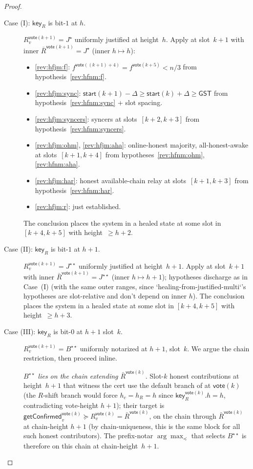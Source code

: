 \documentclass{article}
\newcommand{\key}{\mathsf{key}}
\newcommand{\start}{\mathsf{start}}
\newcommand{\vote}{\mathsf{vote}}
\newcommand{\comm}[1]{\bar{#1}}
\newcommand{\getConfirmed}{\textsf{getConfirmed}\xspace}
\theoremstyle{plain}
\theoremstyle{definition}
\theoremstyle{remark}
\newcommand{\GST}{\ensuremath{\mathsf{GST}}}
\newcommand{\OHM}{online-honest majority\xspace}
\newcommand{\HAR}{honest available-chain relay\xspace}
\newcommand{\AHA}{all-honest-awake\xspace}
\begin{document}
\begin{proof}
\begin{description}
\item[{Case (I): $\key_R$ is bit-$1$ at $h$.}]\hfill

$R_v^{\vote(k+1)} = J^\star$ uniformly justified at height~$h$. Apply  at slot~$k+1$ with inner $\comm{R}^{\vote(k+1)} = J^\star$ (inner $h \mapsto h$):
\begin{itemize}
  \item \ref{rev:hfjm:f}: $f^{\vote((k+1)+4)} = f^{\vote(k+5)} < n/3$ from hypothesis~\ref{rev:hfnm:f}.
  \item \ref{rev:hfjm:sync}: $\start(k+1) - \Delta \geq \start(k) + \Delta \geq \GST$ from hypothesis~\ref{rev:hfnm:sync} + slot spacing.
  \item \ref{rev:hfjm:syncers}: syncers at slots~$[k+2, k+3]$ from hypothesis~\ref{rev:hfnm:syncers}.
  \item \ref{rev:hfjm:ohm}, \ref{rev:hfjm:aha}: \OHM, \AHA at slots~$[k+1, k+4]$ from hypotheses~\ref{rev:hfnm:ohm}, \ref{rev:hfnm:aha}.
  \item \ref{rev:hfjm:har}: \HAR at slots~$[k+1, k+3]$ from hypothesis~\ref{rev:hfnm:har}.
  \item \ref{rev:hfjm:r}: just established.
\end{itemize}
The conclusion places the system in a healed state at some slot in $[k+4, k+5]$ with height~$\geq h+2$.

\item[{Case (II): $\key_R$ is bit-$1$ at $h+1$.}]\hfill

$R_v^{\vote(k+1)} = J^{\star\star}$ uniformly justified at height~$h+1$. Apply  at slot~$k+1$ with inner $\comm{R}^{\vote(k+1)} = J^{\star\star}$ (inner $h \mapsto h+1$); hypotheses discharge as in Case~(I) (with the same outer ranges, since `healing-from-justified-multi`'s hypotheses are slot-relative and don't depend on inner $h$). The conclusion places the system in a healed state at some slot in $[k+4, k+5]$ with height~$\geq h+3$.

\item[{Case (III): $\key_R$ is bit-$0$ at $h+1$ slot~$k$.}]\hfill

$R_v^{\vote(k+1)} = B^{\star\star}$ uniformly notarized at $h+1$, slot~$k$. We argue the chain restriction, then proceed inline.

\emph{$B^{\star\star}$ lies on the chain extending $\comm{R}^{\vote(k)}$.}
Slot-$k$ honest contributions at height~$h+1$ that witness the cert use the default branch of  at $\vote(k)$ (the $R$-shift branch would force $h_c = h_R = h$ since $\key_R^{\vote(k)}.h = h$, contradicting vote-height $h+1$); their target is $\getConfirmed_v^{\vote(k)} \succeq R_v^{\vote(k)} = \comm{R}^{\vote(k)}$, on the chain through $\comm{R}^{\vote(k)}$ at chain-height $h+1$ (by chain-uniqueness, this is the same block for all such honest contributors). The prefix-notar $\arg\max_\preceq$ that selects $B^{\star\star}$ is therefore on this chain at chain-height~$h+1$.


\end{description}
\end{proof}
\end{document}
